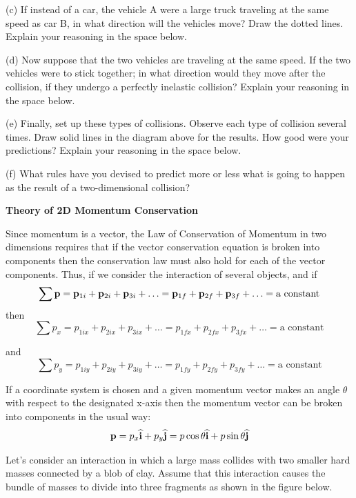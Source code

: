 (c) If instead of a car, the vehicle A were a large truck traveling at the same
speed as car B, in what direction will the vehicles move? Draw the dotted lines.
Explain your reasoning in the space below.
\vspace{20mm}

(d) Now suppose that the two vehicles are traveling at the same speed. If the
two vehicles were to stick together; in what direction would they move after
the collision, if they undergo a perfectly inelastic collision? Explain your
reasoning in the space below.
\vspace{20mm}

\newpage

(e) Finally, set up these types of collisions. Observe each type of collision
several times. Draw solid lines in the diagram above for the results. How good
were your predictions? Explain your reasoning in the space below.
\vspace{20mm}

(f) What rules have you devised to predict more or less what is going to happen
as the result of a two-dimensional collision?
\vspace{20mm}

\textbf{Theory of 2D Momentum Conservation }

Since momentum is a vector, the Law of Conservation of Momentum in two dimensions
requires that if the vector conservation equation is broken into components
then the conservation law must also hold for each of the vector components.
Thus, if we consider the interaction of several objects, and if 
\[
\sum {\bf p}={{\bf p}_{1i}}+{{\bf p}_{2i}}+{{\bf p}_{3i}}+\ldots ={{\bf p}_{1f}}+{{\bf p}_{2f}}+{{\bf p}_{3f}}+\ldots =\mbox{a constant}\]
then
\[
\sum p_{x}=p_{1ix}+p_{2ix}+p_{3ix}+\ldots =p_{1fx}+p_{2fx}+p_{3fx}+\ldots =
\mbox{a constant}\]


and
\[
\sum p_{y}=p_{1iy}+p_{2iy}+p_{3iy}+\ldots =p_{1fy}+p_{2fy}+p_{3fy}+\ldots =
\mbox{a constant}\]


If a coordinate system is chosen and a given momentum vector makes an angle
\( \theta  \) with respect to the designated x-axis then the momentum vector
can be broken into components in the usual way:
\[
{\bf p}=p_{x}\widehat{\bf i}+p_{y}\widehat{\bf j}=p\cos \theta \widehat{\bf i}+
p\sin \theta \widehat{\bf j}\]


Let's consider an interaction in which a large mass collides with two smaller
hard masses connected by a blob of clay. Assume that this interaction causes
the bundle of masses to divide into three fragments as shown in the figure below.

